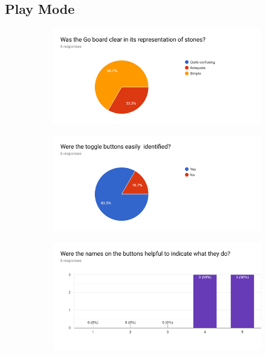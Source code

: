 \documentclass{l4proj}
\begin{document}
\begin{appendices}
\section{Play Mode}

\begin{figure}[H]
\centering
\begin{subfigure}[b]{\textwidth}
\centering
\includegraphics[width=\textwidth]{A1/4.png}
\end{subfigure}
\end{figure}


\begin{figure}[H]
\centering
\begin{subfigure}[b]{\textwidth}
\centering
\includegraphics[width=\textwidth]{A1/5.png}
\end{subfigure}
\end{figure}


\begin{figure}[H]
\centering
\begin{subfigure}[b]{\textwidth}
\centering
\includegraphics[width=\textwidth]{A1/6.png}
\end{subfigure}
\end{figure}




\end{appendices}
\end{document}

